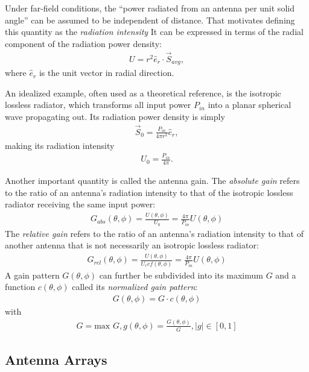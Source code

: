 Under far-field conditions,
the ``power radiated from an antenna per unit solid angle'' can be assumed to be independent of distance.
That motivates defining this quantity as the \emph{radiation intensity}
It can be expressed in terms of the radial component of the radiation power density:
\begin{align}
    U = r^2 \hat e_r \cdot \vec S_{avg},
\end{align}
where $\hat e_r$ is the unit vector in radial direction.

An idealized example, often used as a theoretical reference, is the isotropic lossless radiator, 
which transforms all input power $P_{in}$ into a planar spherical wave propagating out.
Its radiation power density is simply
\begin{align}
    \vec S_{0} = \frac{P_{in}}{4\pi r^2} \hat e_r,
\end{align}
making its radiation intensity
\begin{align}
    U_{0} = \frac{P_{in}}{4\pi}.
\end{align}

Another important quantity is called the antenna gain.
The \emph{absolute gain} refers to the ratio of an antenna's radiation intensity
to that of the isotropic lossless radiator receiving the same input power:
\begin{align}
    G_{abs}(\theta, \phi) = \frac{U(\theta, \phi)}{U_0} = \frac{4\pi}{P_{in}} U(\theta, \phi)
\end{align} 
The  \emph{relative gain} refers to the ratio of an antenna's radiation intensity
to that of another antenna that is not necessarily an isotropic lossless radiator:
\begin{align}
    G_{rel}(\theta, \phi) = \frac{U(\theta, \phi)}{U_ref(\theta, \phi)} = \frac{4\pi}{P_{in}} U(\theta, \phi)
\end{align} 
A gain pattern $G(\theta, \phi)$ can further be subdivided into its maximum $G$ 
and a function $c(\theta, \phi)$ called its \emph{normalized gain pattern}:
\begin{align}
    G(\theta, \phi) = G \cdot c(\theta, \phi)
\end{align}
with 
\begin{align*}
    G = \text{max }G, g(\theta, \phi) = \frac{G(\theta, \phi)}{G}, |g| \in [0,1]
\end{align*}



\subsection{Antenna Arrays}

